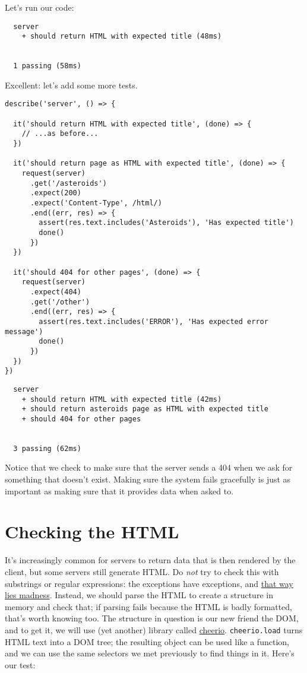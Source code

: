 Let's run our code:

\begin{verbatim}
  server
    + should return HTML with expected title (48ms)


  1 passing (58ms)
\end{verbatim}

\noindent
Excellent: let's add some more tests.

\begin{verbatim}
describe('server', () => {

  it('should return HTML with expected title', (done) => {
    // ...as before...
  })

  it('should return page as HTML with expected title', (done) => {
    request(server)
      .get('/asteroids')
      .expect(200)
      .expect('Content-Type', /html/)
      .end((err, res) => {
        assert(res.text.includes('Asteroids'), 'Has expected title')
        done()
      })
  })

  it('should 404 for other pages', (done) => {
    request(server)
      .expect(404)
      .get('/other')
      .end((err, res) => {
        assert(res.text.includes('ERROR'), 'Has expected error message')
        done()
      })
  })
})
\end{verbatim}

\begin{verbatim}
  server
    + should return HTML with expected title (42ms)
    + should return asteroids page as HTML with expected title
    + should 404 for other pages


  3 passing (62ms)
\end{verbatim}

Notice that we check to make sure that the server sends a 404
when we ask for something that doesn't exist.
Making sure the system fails gracefully is just as important
as making sure that it provides data when asked to.

\section{Checking the HTML}\label{s:testing-html}

It's increasingly common for servers to return data that is then rendered by the client,
but some servers still generate HTML.
Do \emph{not} try to check this with substrings or regular expressions:
the exceptions have exceptions,
and \href{https://stackoverflow.com/a/1732454}{that way lies madness}.
Instead,
we should parse the HTML to create a structure in memory and check that;
if parsing fails because the HTML is badly formatted, that's worth knowing too.
The structure in question is our new friend the DOM,
and to get it,
we will use (yet another) library called \href{https://cheerio.js.org/}{cheerio}.
\texttt{cheerio.load} turns HTML text into a DOM tree;
the resulting object can be used like a function,
and we can use the same selectors we met previously to find things in it.
Here's our test:

